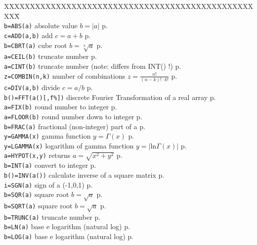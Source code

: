 \begin{tabbing}
XXXXXXXXXXXXXXXXXXX\=XXXXXXXXXXXXXXXXXXXXXXXXXXXXXXXX\=\kill\\
\verb|b=ABS(a)|		\> absolute value $b=|a|$\> p.\pageref{ABS}\\
\verb|c=ADD(a,b)|	\> add $c=a+b$\> p.\pageref{ADD}\\
\verb|b=CBRT(a)|	\> cube root $b=\sqrt[3]{a}$\> p.\pageref{CBRT}\\
\verb|a=CEIL(b)|	\> truncate number \> p.\pageref{CEIL}\\
\verb|a=CINT(b)|	\> truncate number (note: differs from INT() !)\> p.\pageref{CINT}\\
\verb|z=COMBIN(n,k)| \> number of combinations $z=\frac{n!}{(n-k)!\cdot k!}$\> p.\pageref{COMBIN}\\
\verb|c=DIV(a,b)| \> divide $c=a/b$ \> p.\pageref{DIV}\\
\verb|b()=FFT(a()[,f%])| \> discrete Fourier Transformation  of a real array\> p.\pageref{FFT}\\
\verb|a=FIX(b)|	\> round number to integer \> p.\pageref{FIX}\\
\verb|a=FLOOR(b)|	\> round number down to integer \> p.\pageref{FLOOR}\\
\verb|b=FRAC(a)|	\> fractional (non-integer) part of a \> p.\pageref{FRAC}\\
\verb|y=GAMMA(x)|       \> gamma function $y=\Gamma(x)$ \> p.\pageref{GAMMA}\\
\verb|y=LGAMMA(x)|       \> logarithm of gamma function $y=|\mathrm{ln}\Gamma(x)|$ \> p.\pageref{LGAMMA}\\
\verb|a=HYPOT(x,y)|	\>returns $a=\sqrt{x^2+y^2}$ \> p.\pageref{HYPOT}\\
\verb|b=INT(a)|		\> convert to integer \> p.\pageref{INT}\\
\verb|b()=INV(a())|\> calculate inverse of a square matrix\> p.\pageref{INV} \\
\verb|i=SGN(a)|		\> sign of a (-1,0,1) \> p.\pageref{SGN}\\
\verb|b=SQR(a)|		\> square root $b=\sqrt{a}$\> p.\pageref{SQR}\\
\verb|b=SQRT(a)|	\> square root $b=\sqrt{a}$\> p.\pageref{SQRT}\\
\verb|b=TRUNC(a)|	\> truncate number \> p.\pageref{TRUNC}\\
\verb|b=LN(a)| 		\> base e logarithm (natural log) \> p.\pageref{LN}\\
\verb|b=LOG(a)|		\> base e logarithm (natural log) \> p.\pageref{LOG}\\

\end{tabbing}
